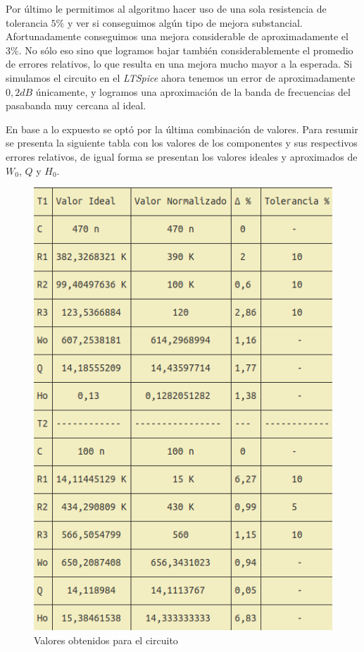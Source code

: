 \documentclass[11pt,a4paper]{report}
\begin{document}
\begin{list}{•}
Por último le permitimos al algoritmo hacer uso de una sola resistencia de tolerancia $5\%$ y ver si conseguimos algún tipo de mejora substancial. Afortunadamente conseguimos una mejora considerable de aproximadamente el $3\%$. No sólo eso sino que logramos bajar también considerablemente el promedio de errores relativos, lo que resulta en una mejora mucho mayor a la esperada. Si simulamos el circuito en el \textit{LTSpice} 
ahora tenemos un error de aproximadamente $0,2dB$ únicamente, y logramos una aproximación de la banda de frecuencias del pasabanda muy cercana al ideal.

\end{list}

\bigskip
En base a lo expuesto se optó por la última combinación de valores. Para resumir 
se presenta la siguiente tabla con los valores de los componentes y sus respectivos errores relativos, de igual forma se presentan los valores ideales y aproximados de $W_{0}$, $Q$ y $H_{0}$.

\begin{figure}[!ht]
\centering
\includegraphics[scale=1]{tablaValores.png}
\caption{Valores obtenidos para el circuito}
\end{figure}
\end{document}
